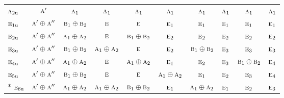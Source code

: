 \documentclass[10pt,a4paper]{article}
\numberwithin{equation}{section}
\newcommand{\irr}[1]{\text{\normalfont\scshape #1}}
\newcommand{\ptag}[1]{\mathrm{#1}}
\begin{document}
{\begin{longtable}{@{}lccccccccc@{}}
$\irr{a}_{2\ptag{u}}$ & $\irr{a}'$ & $\irr{a}_{1}$ & $\irr{a}_{1}$ & $\irr{a}_{1}$ & $\irr{a}_{1}$ & $\irr{a}_{1}$ & $\irr{a}_{1}$ & $\irr{a}_{1}$ & $\irr{a}_{1}$\\
$\irr{e}_{1\ptag{u}}$ & $\irr{a}'\oplus \irr{a}''$ & $\irr{b}_{1}\oplus \irr{b}_{2}$ & $\irr{e}$ & $\irr{e}$ & $\irr{e}_{1}$ & $\irr{e}_{1}$ & $\irr{e}_{1}$ & $\irr{e}_{1}$ & $\irr{e}_{1}$\\
$\irr{e}_{2\ptag{u}}$ & $\irr{a}'\oplus \irr{a}''$ & $\irr{a}_{1}\oplus \irr{a}_{2}$ & $\irr{e}$ & $\irr{b}_{1}\oplus \irr{b}_{2}$ & $\irr{e}_{2}$ & $\irr{e}_{2}$ & $\irr{e}_{2}$ & $\irr{e}_{2}$ & $\irr{e}_{2}$\\
$\irr{e}_{3\ptag{u}}$ & $\irr{a}'\oplus \irr{a}''$ & $\irr{b}_{1}\oplus \irr{b}_{2}$ & $\irr{a}_{1}\oplus \irr{a}_{2}$ & $\irr{e}$ & $\irr{e}_{2}$ & $\irr{b}_{1}\oplus \irr{b}_{2}$ & $\irr{e}_{3}$ & $\irr{e}_{3}$ & $\irr{e}_{3}$\\
$\irr{e}_{4\ptag{u}}$ & $\irr{a}'\oplus \irr{a}''$ & $\irr{a}_{1}\oplus \irr{a}_{2}$ & $\irr{e}$ & $\irr{a}_{1}\oplus \irr{a}_{2}$ & $\irr{e}_{1}$ & $\irr{e}_{2}$ & $\irr{e}_{3}$ & $\irr{b}_{1}\oplus \irr{b}_{2}$ & $\irr{e}_{4}$\\
$\irr{e}_{5\ptag{u}}$ & $\irr{a}'\oplus \irr{a}''$ & $\irr{b}_{1}\oplus \irr{b}_{2}$ & $\irr{e}$ & $\irr{e}$ & $\irr{a}_{1}\oplus \irr{a}_{2}$ & $\irr{e}_{1}$ & $\irr{e}_{2}$ & $\irr{e}_{3}$ & $\irr{e}_{4}$\\*
$\irr{e}_{6\ptag{u}}$ & $\irr{a}'\oplus \irr{a}''$ & $\irr{a}_{1}\oplus \irr{a}_{2}$ & $\irr{a}_{1}\oplus \irr{a}_{2}$ & $\irr{b}_{1}\oplus \irr{b}_{2}$ & $\irr{e}_{1}$ & $\irr{a}_{1}\oplus \irr{a}_{2}$ & $\irr{e}_{1}$ & $\irr{e}_{2}$ & $\irr{e}_{3}$\\
\bottomrule\end{longtable}}
\end{document}
